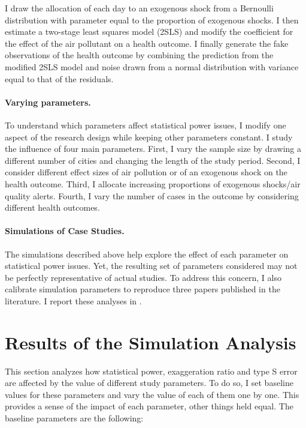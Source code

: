 \documentclass[12pt]{article}
\begin{document}
        \noindent I draw the allocation of each day to an exogenous shock from a Bernoulli distribution with parameter equal to the proportion of exogenous shocks. I then estimate a two-stage least squares model (2SLS) and modify the coefficient for the effect of the air pollutant on a health outcome. I finally generate the fake observations of the health outcome by combining the prediction from the modified 2SLS model and noise drawn from a normal distribution with variance equal to that of the residuals.
        
        \paragraph{Varying parameters.} To understand which parameters affect statistical power issues, I modify one aspect of the research design while keeping other parameters constant. I study the influence of four main parameters. First, I vary the sample size by drawing a different number of cities and changing the length of the study period. Second, I consider different effect sizes of air pollution or of an exogenous shock on the health outcome. Third, I allocate increasing proportions of exogenous shocks/air quality alerts. Fourth, I vary the number of cases in the outcome by considering different health outcomes.

        \paragraph{Simulations of Case Studies.} The simulations described above help explore the effect of each parameter on statistical power issues. Yet, the resulting set of parameters considered may not be perfectly representative of actual studies. To address this concern, I also calibrate simulation parameters to reproduce three papers published in the literature. I report these analyses in .




\section{Results of the Simulation Analysis}\label{section_results}

        This section analyzes how statistical power, exaggeration ratio and type S error are affected by the value of different study parameters. To do so, I set baseline values for these parameters and vary the value of each of them one by one. This provides a sense of the impact of each parameter, other things held equal. The baseline parameters are the following:
\end{document}
